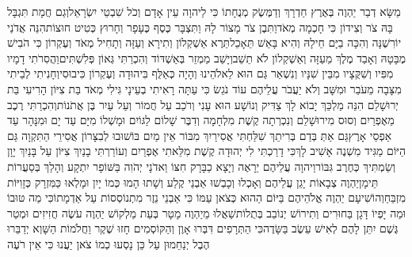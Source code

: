 \documentclass[../main/main.tex]{subfiles}
\begin{document}
\begin{multicols}{\ncols}
מַשָּׂא דְבַר יַהְוֶה בְּאֶרֶץ חַדְרָךְ וְדַמֶּשֶׂק מְנֻחָתוֹ כִּי לַיהוָה עֵין אָדָם וְכֹל שִׁבְטֵי יִשְׂרָאֵל\PreVerseSpace{}וְגַם חֲמָת תִּגְבָּל בָּהּ צֹר וְצִידוֹן כִּי חָכְמָה מְאֹד\PreVerseSpace{}וַתִּבֶן צֹר מָצוֹר לָהּ וַתִּצְבָּר כֶּסֶף כֶּעָפָר וְחָרוּץ כְּטִיט חוּצוֹת\PreVerseSpace{}הִנֵּה אֲדֹנַי יוֹרִשֶׁנָּה וְהִכָּה בַיָּם חֵילָהּ וְהִיא בָּאֵשׁ תֵּאָכֵל\PreVerseSpace{}תֵּרֶא אַשְׁקְלוֹן וְתִירָא וְעַזָּה וְתָחִיל מְאֹד וְעֶקְרוֹן כִּי הֹבִישׁ מֶבָּטָהּ וְאָבַד מֶלֶךְ מֵעַזָּה וְאַשְׁקְלוֹן לֹא תֵשֵׁב\PreVerseSpace{}וְיָשַׁב מַמְזֵר בְּאַשְׁדּוֹד וְהִכְרַתִּי גְּאוֹן פְּלִשְׁתִּים\PreVerseSpace{}וַהֲסִרֹתִי דָמָיו מִפִּיו וְשִׁקֻּצָיו מִבֵּין שִׁנָּיו וְנִשְׁאַר גַּם הוּא לֵאלֹהֵינוּ וְהָיָה כְּאַלֻּף בִּיהוּדָה וְעֶקְרוֹן כִּיבוּסִי\PreVerseSpace{}וְחָנִיתִי לְבֵיתִי מִצָּבָה מֵעֹבֵר וּמִשָּׁב וְלֹא יַעֲבֹר עֲלֵיהֶם עוֹד נֹגֵשׂ כִּי עַתָּה רָאִיתִי בְעֵינָי \ClosedSection{}גִּילִי מְאֹד בַּת צִיּוֹן הָרִיעִי בַּת יְרוּשָׁלֵם הִנֵּה מַלְכֵּךְ יָבוֹא לָךְ צַדִּיק וְנוֹשָׁע הוּא עָנִי וְרֹכֵב עַל חֲמוֹר וְעַל עַיִר בֶּן אֲתֹנוֹת\PreVerseSpace{}וְהִכְרַתִּי רֶכֶב מֵאֶפְרַיִם וְסוּס מִירוּשָׁלֵם וְנִכְרְתָה קֶשֶׁת מִלְחָמָה וְדִבֶּר שָׁלוֹם לַגּוֹיִם וּמָשְׁלוֹ מִיָּם עַד יָם וּמִנָּהָר עַד אַפְסֵי אָרֶץ\PreVerseSpace{}גַּם אַתְּ בְּדַם בְּרִיתֵךְ שִׁלַּחְתִּי אֲסִירַיִךְ מִבּוֹר אֵין מַיִם בּוֹ\PreVerseSpace{}שׁוּבוּ לְבִצָּרוֹן אֲסִירֵי הַתִּקְוָה גַּם הַיּוֹם מַגִּיד מִשְׁנֶה אָשִׁיב לָךְ\PreVerseSpace{}כִּי דָרַכְתִּי לִי יְהוּדָה קֶשֶׁת מִלֵּאתִי אֶפְרַיִם וְעוֹרַרְתִּי בָנַיִךְ צִיּוֹן עַל בָּנַיִךְ יָוָן וְשַׂמְתִּיךְ כְּחֶרֶב גִּבּוֹר\PreVerseSpace{}וַיהוָה עֲלֵיהֶם יֵרָאֶה וְיָצָא כַבָּרָק חִצּוֹ וַאדֹנָי יְהֹוִה בַּשּׁוֹפָר יִתְקָע וְהָלַךְ בְּסַעֲרוֹת תֵּימָן\PreVerseSpace{}יַהְוֶה צְבָאוֹת יָגֵן עֲלֵיהֶם וְאָכְלוּ וְכָבְשׁוּ אַבְנֵי קֶלַע וְשָׁתוּ הָמוּ כְּמוֹ יָיִן וּמָלְאוּ כַּמִּזְרָק כְּזָוִיּוֹת מִזְבֵּחַ\PreVerseSpace{}וְהוֹשִׁיעָם יַהְוֶה אֱלֹהֵיהֶם בַּיּוֹם הַהוּא כְּצֹאן עַמּוֹ כִּי אַבְנֵי נֵזֶר מִתְנוֹסְסוֹת עַל אַדְמָתוֹ\PreVerseSpace{}כִּי מַה טּוּבוֹ וּמַה יָּפְיוֹ דָּגָן בַּחוּרִים וְתִירוֹשׁ יְנוֹבֵב בְּתֻלוֹת\PreChapterSpace{}שַׁאֲלוּ מֵיַהְוֶה מָטָר בְּעֵת מַלְקוֹשׁ יַהְוֶה עֹשֶׂה חֲזִיזִים וּמְטַר גֶּשֶׁם יִתֵּן לָהֶם לְאִישׁ עֵשֶׂב בַּשָּׂדֶה\PreVerseSpace{}כִּי הַתְּרָפִים דִּבְּרוּ אָוֶן וְהַקּוֹסְמִים חָזוּ שֶׁקֶר וַחֲלֹמוֹת הַשָּׁוְא יְדַבֵּרוּ הֶבֶל יְנַחֵמוּן עַל כֵּן נָסְעוּ כְמוֹ צֹאן יַעֲנוּ כִּי אֵין רֹעֶה\OpenSection{}\par

\end{multicols}
\end{document}
